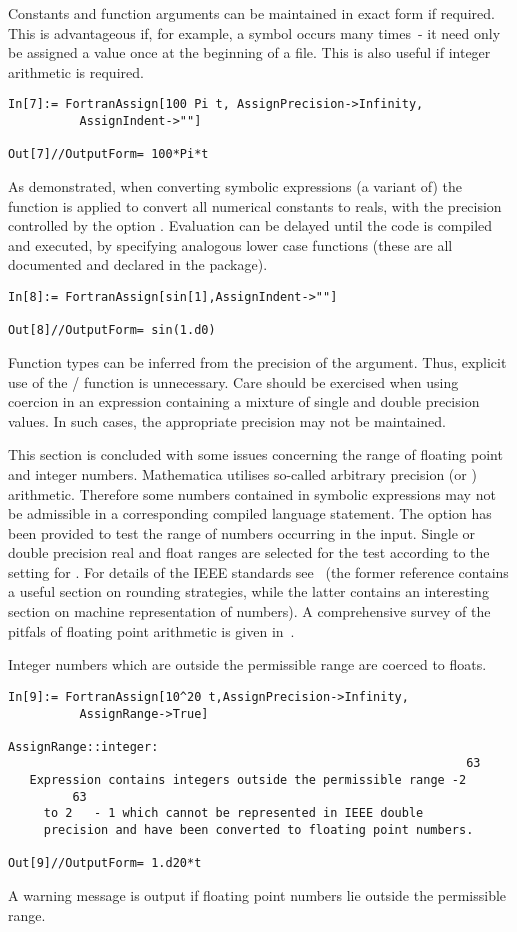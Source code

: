 \documentclass [12pt,twoside]{article}
\begin{document}
Constants and function arguments can be maintained in exact form if required. This
is advantageous if, for example, a symbol occurs many times~- it need only be
assigned a value once at the beginning of a file. This is also useful if integer
arithmetic is required.

\begin{verbatim}
In[7]:= FortranAssign[100 Pi t, AssignPrecision->Infinity,
          AssignIndent->""]

Out[7]//OutputForm= 100*Pi*t
\end{verbatim}
As demonstrated, when converting symbolic expressions (a variant of) the function
 is applied to convert all numerical constants to reals, with the
precision controlled by the option . Evaluation can be
delayed until the code is compiled and executed, by specifying analogous lower
case functions (these are all documented and declared in the package).

\begin{verbatim}
In[8]:= FortranAssign[sin[1],AssignIndent->""]

Out[8]//OutputForm= sin(1.d0)
\end{verbatim}
Function types can be inferred from the precision of the argument.
Thus, explicit use of the / function is unnecessary.
Care should be exercised when using coercion in an expression containing a
mixture of single and double precision values. In such cases, the appropriate
precision may not be maintained.

This section is concluded with some issues concerning the range of floating point
and integer numbers. Mathematica utilises so-called arbitrary precision (or
) arithmetic. Therefore some numbers contained in symbolic
expressions may not be admissible in a corresponding compiled language
statement.  The option  has been provided to test the
range of numbers occurring in the input. Single or double precision real and float
ranges are selected for the test according to the setting for
. For details of the IEEE standards
see~\cite{skeelbook,stallings} (the former reference contains a useful section on
rounding strategies, while the latter contains an interesting section on machine
representation of numbers). A comprehensive survey of the pitfals of floating point
arithmetic is given in~\cite{goldberg-91}.

\pagebreak[2]

\noindent
Integer numbers which are outside the permissible range are coerced to floats.
\begin{verbatim}
In[9]:= FortranAssign[10^20 t,AssignPrecision->Infinity,
          AssignRange->True]

AssignRange::integer: 
                                                                63
   Expression contains integers outside the permissible range -2
         63
     to 2   - 1 which cannot be represented in IEEE double
     precision and have been converted to floating point numbers.

Out[9]//OutputForm= 1.d20*t
\end{verbatim}
A warning message is output if floating point numbers lie outside the permissible
range.
\end{document}
